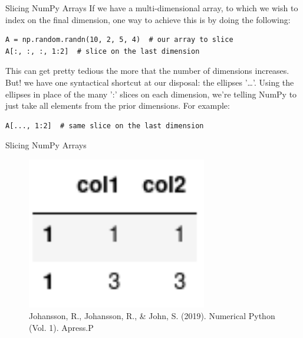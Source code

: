 \documentclass[10pt]{beamer}
\begin{document}
\begin{frame}[label={sec:org882a33d},fragile]{Slicing NumPy Arrays}
 If we have a multi-dimensional array, to which we wish to index on the final
dimension, one way to achieve this is by doing the following:

\begin{verbatim}
A = np.random.randn(10, 2, 5, 4)  # our array to slice
A[:, :, :, 1:2]  # slice on the last dimension
\end{verbatim}

This can get pretty tedious the more that the number of dimensions increases. But! we
have one syntactical shortcut at our disposal: the ellipses '\ldots{}'. Using the ellipses
in place of the many ':' slices on each dimension, we're telling NumPy to just take
all elements from the prior dimensions. For example:

\begin{verbatim}
A[..., 1:2]  # same slice on the last dimension
\end{verbatim}
\end{frame}

\begin{frame}[label={sec:org7ecac6f}]{Slicing NumPy Arrays}
\begin{figure}[htbp]
\centering
\includegraphics[width=0.7\textwidth]{./images/indexing.png}
\caption{Johansson, R., Johansson, R., \& John, S. (2019). Numerical Python (Vol. 1). Apress.P}
\end{figure}
\end{frame}
\end{document}

